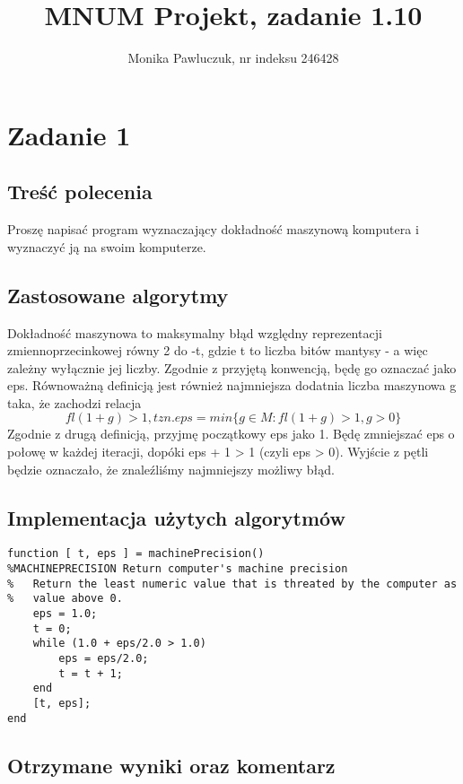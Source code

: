 \documentclass[11pt]{article} %
\title{MNUM Projekt, zadanie 1.10}
\author{Monika Pawluczuk, nr indeksu 246428}
\begin{document}
\maketitle

\section{Zadanie 1}

\subsection{Treść polecenia}

Proszę napisać program wyznaczający dokładność maszynową komputera i wyznaczyć ją na swoim komputerze.

\subsection{Zastosowane algorytmy}

Dokładność maszynowa to maksymalny błąd względny reprezentacji zmiennoprzecinkowej równy 2 do -t, gdzie t to liczba bitów mantysy - a więc zależny wyłącznie jej liczby. Zgodnie z przyjętą konwencją, będę go oznaczać jako eps.
Równoważną definicją jest również najmniejsza dodatnia liczba maszynowa g taka, że zachodzi relacja 
\begin{equation}
fl(1 + g) > 1, tzn. eps = min \{  g \in M : fl(1 + g) > 1, g > 0\}
\end{equation}
Zgodnie z drugą definicją, przyjmę początkowy eps jako 1. Będę zmniejszać eps o połowę w każdej iteracji, dopóki eps + 1 > 1 (czyli eps > 0). Wyjście z pętli będzie oznaczało, że znaleźliśmy najmniejszy możliwy błąd.

\subsection{Implementacja użytych algorytmów}

\begin{verbatim}
function [ t, eps ] = machinePrecision()
%MACHINEPRECISION Return computer's machine precision
%   Return the least numeric value that is threated by the computer as
%   value above 0.
    eps = 1.0;
    t = 0;
    while (1.0 + eps/2.0 > 1.0)
        eps = eps/2.0;
        t = t + 1;
    end
    [t, eps];
end

\end{verbatim}

\subsection{Otrzymane wyniki oraz komentarz}
\end{document}

